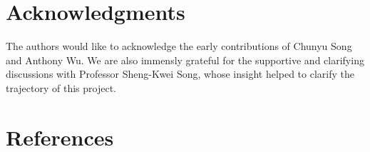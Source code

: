 \documentclass[
]{article}
\begin{document}
\hypertarget{acknowledgments}{%
\section{Acknowledgments}\label{acknowledgments}}

The authors would like to acknowledge the early contributions of Chunyu
Song and Anthony Wu. We are also immensly grateful for the supportive
and clarifying discussions with Professor Sheng-Kwei Song, whose insight
helped to clarify the trajectory of this project.

\hypertarget{references}{%
\section{References}\label{references}}
\end{document}

